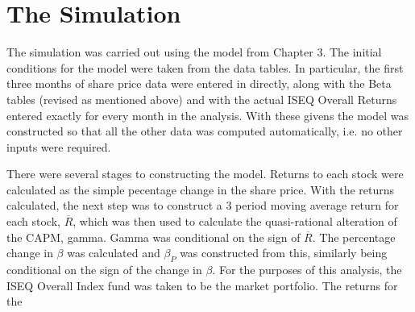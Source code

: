 \documentclass{ucthesis}
\begin{document}
\section{The Simulation}

The simulation was carried out using the model from Chapter 3. The initial
conditions for the model were taken from the data tables. In particular, the
first three months of share price data were entered in directly, along with
the Beta tables (revised as mentioned above) and with the actual ISEQ
Overall Returns entered exactly for every month in the analysis. With these
givens the model was constructed so that all the other data was computed
automatically, i.e. no other inputs were required.

There were several stages to constructing the model. Returns to each stock
were calculated as the simple pecentage change in the share price. With the
returns calculated, the next step was to construct a 3 period moving average
return for each stock, $\overline{R}$, which was then used to calculate the
quasi-rational alteration of the CAPM, gamma. Gamma was conditional on the
sign of $\overline{R}$. The percentage change in $\beta $ was calculated and 
$\beta _{P}$ was constructed from this, similarly being conditional on the
sign of the change in $\beta $. For the purposes of this analysis, the ISEQ
Overall Index fund was taken to be the market portfolio. The returns for the
\end{document}
